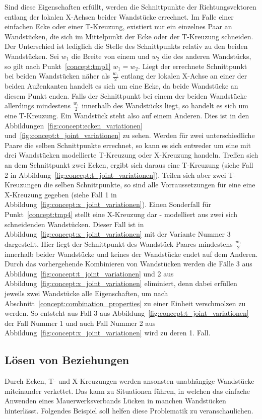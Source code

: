 Sind diese Eigenschaften erfüllt, werden die Schnittpunkte der Richtungsvektoren entlang der lokalen X-Achsen beider Wandstücke errechnet.
Im Falle einer einfachen Ecke oder einer T-Kreuzung, existiert nur ein einzelnes Paar an Wandstücken, die sich im Mittelpunkt der Ecke oder der T-Kreuzung schneiden.
Der Unterschied ist lediglich die Stelle des Schnittpunkts relativ zu den beiden Wandstücken.
Sei \(w_1\) die Breite von einem und \(w_2\) die des anderen Wandstücks, so gilt nach Punkt~\ref{concept:tmp1} \(w_1 = w_2\).
Liegt der errechnete Schnittpunkt bei beiden Wandstücken näher als \(\frac{w_1}{2}\) entlang der lokalen X-Achse an einer der beiden Außenkanten handelt es sich um eine Ecke, da beide Wandstücke an diesem Punkt enden.
Falls der Schnittpunkt bei einem der beiden Wandstücke allerdings mindestens  \(\frac{w_1}{2}\) innerhalb des Wandstücks liegt, so handelt es sich um eine T-Kreuzung.
Ein Wandstück steht also auf einem Anderen.
Dies ist in den Abbildungen~\ref{fig:concept:ecken_variationen} und~\ref{fig:concept:t_joint_variationen} zu sehen. 
Werden für zwei unterschiedliche Paare die selben Schnittpunkte errechnet, so kann es sich entweder um eine mit drei Wandstücken modellierte T-Kreuzung oder X-Kreuzung handeln.
Treffen sich an dem Schnittpunkt zwei Ecken, ergibt sich daraus eine T-Kreuzung (siehe Fall 2 in Abbildung~\ref{fig:concept:t_joint_variationen}).
Teilen sich aber zwei T-Kreuzungen die selben Schnittpunkte, so sind alle Vorraussetzungen für eine eine X-Kreuzung gegeben (siehe Fall 1 in Abbildung~\ref{fig:concept:x_joint_variationen}).
Einen Sonderfall für Punkt~\ref{concept:tmp4} stellt eine X-Kreuzung dar - modelliert aus zwei sich schneidenden Wandstücken.
Dieser Fall ist in Abbildung~\ref{fig:concept:x_joint_variationen} mit der Variante Nummer 3 dargestellt.
Hier liegt der Schnittpunkt des Wandstück-Paares mindestens \(\frac{w_1}{2}\) innerhalb beider Wandstücke und keines der Wandstücke endet auf dem Anderen.
Durch das vorhergehende Kombinieren von Wandstücken werden die Fälle 3 aus Abbildung~\ref{fig:concept:t_joint_variationen} und 2 aus Abbildung~\ref{fig:concept:x_joint_variationen} eliminiert, denn dabei erfüllen jeweils zwei Wandstücke alle Eigenschaften, um nach Abschnitt~\ref{concept:combination_properties} zu einer Einheit verschmolzen zu werden.
So entsteht aus Fall 3 aus Abbildung~\ref{fig:concept:t_joint_variationen} der Fall Nummer 1 und auch Fall Nummer 2 aus Abbildung~\ref{fig:concept:x_joint_variationen} wird zu deren 1. Fall.

\subsection{Lösen von Beziehungen}
Durch Ecken, T- und X-Kreuzungen werden ansonsten unabhängige Wandstücke miteinander verkettet.
Das kann zu Situationen führen, in welchen das einfache Anwenden eines Mauerwerksverbands Lücken in manchen Wandstücken hinterlässt.
Folgendes Beispiel soll helfen diese Problematik zu veranschaulichen.

